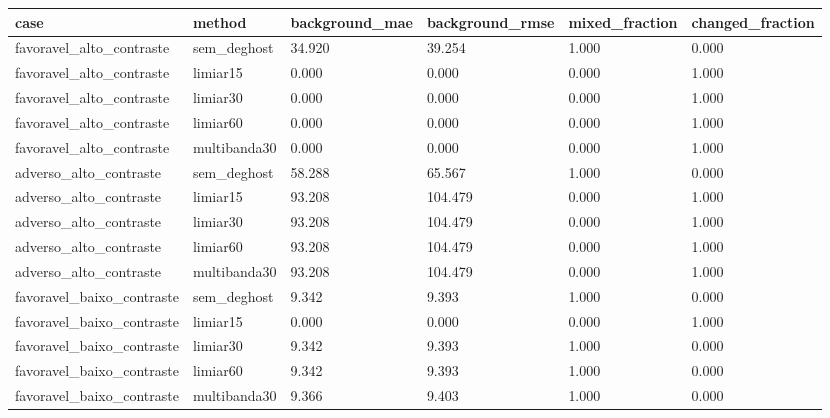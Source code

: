 \begin{tabular}{llllll}
\hline
case & method & background\_mae & background\_rmse & mixed\_fraction & changed\_fraction \\ \hline
favoravel\_alto\_contraste & sem\_deghost & 34.920 & 39.254 & 1.000 & 0.000 \\
favoravel\_alto\_contraste & limiar15 & 0.000 & 0.000 & 0.000 & 1.000 \\
favoravel\_alto\_contraste & limiar30 & 0.000 & 0.000 & 0.000 & 1.000 \\
favoravel\_alto\_contraste & limiar60 & 0.000 & 0.000 & 0.000 & 1.000 \\
favoravel\_alto\_contraste & multibanda30 & 0.000 & 0.000 & 0.000 & 1.000 \\
adverso\_alto\_contraste & sem\_deghost & 58.288 & 65.567 & 1.000 & 0.000 \\
adverso\_alto\_contraste & limiar15 & 93.208 & 104.479 & 0.000 & 1.000 \\
adverso\_alto\_contraste & limiar30 & 93.208 & 104.479 & 0.000 & 1.000 \\
adverso\_alto\_contraste & limiar60 & 93.208 & 104.479 & 0.000 & 1.000 \\
adverso\_alto\_contraste & multibanda30 & 93.208 & 104.479 & 0.000 & 1.000 \\
favoravel\_baixo\_contraste & sem\_deghost & 9.342 & 9.393 & 1.000 & 0.000 \\
favoravel\_baixo\_contraste & limiar15 & 0.000 & 0.000 & 0.000 & 1.000 \\
favoravel\_baixo\_contraste & limiar30 & 9.342 & 9.393 & 1.000 & 0.000 \\
favoravel\_baixo\_contraste & limiar60 & 9.342 & 9.393 & 1.000 & 0.000 \\
favoravel\_baixo\_contraste & multibanda30 & 9.366 & 9.403 & 1.000 & 0.000 \\
\hline
\end{tabular}
